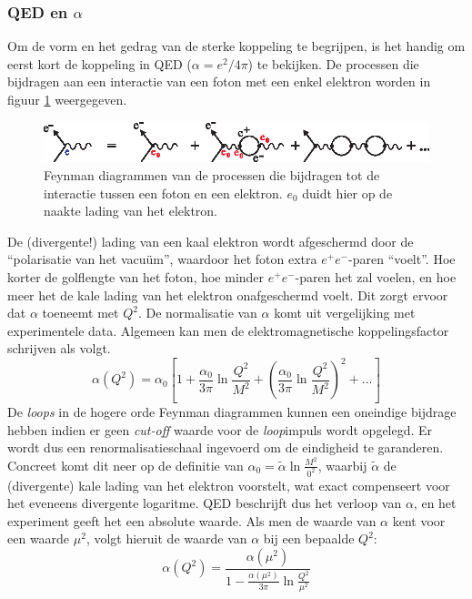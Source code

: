 \documentclass[a4paper,11pt]{article}
\numberwithin{equation}{section} %
\begin{document}
    \subsubsection{QED en $\alpha$} \label{sec:QED}
Om de vorm en het gedrag van de sterke koppeling te begrijpen, is het handig om eerst kort de koppeling in QED ($\alpha = e^2/4\pi$) te bekijken.
De processen die bijdragen aan een interactie van een foton met een enkel elektron worden in figuur \ref{fig:QED} weergegeven.
\begin{figure} [H]
  \begin{center}
    \includegraphics[width=.66\textwidth]{Afbeeldingen/QED.eps}
    \caption{Feynman diagrammen van de processen die bijdragen tot de interactie tussen een foton en een elektron. $e_0$ duidt hier op de naakte lading van het elektron.}
   \label{fig:QED}
  \end{center}
\end{figure}
De (divergente!) lading van een kaal elektron wordt afgeschermd door de “polarisatie van het vacuüm”, waardoor het foton extra $e^+ e^-$-paren “voelt”.
Hoe korter de golflengte van het foton, hoe minder $e^+ e^-$-paren het zal voelen, en hoe meer het de kale lading van het elektron onafgeschermd voelt.
Dit zorgt ervoor dat $\alpha$ toeneemt met $Q^2$.
De normalisatie van $\alpha$ komt uit vergelijking met experimentele data.
Algemeen kan men de elektromagnetische koppelingsfactor schrijven als volgt.
\begin{equation}
\alpha(Q^2) = \alpha_0 \left[ 1+ \frac{\alpha_0}{3\pi} \ln{\frac{Q^2}{M^2}} + \left( \frac{\alpha_0}{3\pi} \ln{\frac{Q^2}{M^2}} \right)^2 +\hdots \right]
\end{equation}
De \textit{loops} in de hogere orde Feynman diagrammen kunnen een oneindige bijdrage hebben indien er geen \textit{cut-off} waarde voor de \textit{loop}impuls wordt opgelegd.
Er wordt dus een renormalisatieschaal ingevoerd om de eindigheid te garanderen.
Concreet komt dit neer op de definitie van $\alpha_0 = \tilde{\alpha} \ln{\frac{M^2}{0^2}}$, waarbij $\tilde{\alpha}$ de (divergente) kale lading van het elektron voorstelt, wat exact compenseert voor het eveneens divergente logaritme.
QED beschrijft dus het verloop van $\alpha$, en het experiment geeft het een absolute waarde.
Als men de waarde van $\alpha$ kent voor een waarde $\mu^2$, volgt hieruit de waarde van $\alpha$ bij een bepaalde $Q^2$:
\begin{equation} \label{eq:alpha}
\alpha( Q^2 ) =\frac{\alpha(\mu^2)}{1-\frac{\alpha(\mu^2)}{3\pi} \ln{\frac{Q^2}{\mu^2}}}
\end{equation}
\end{document}
